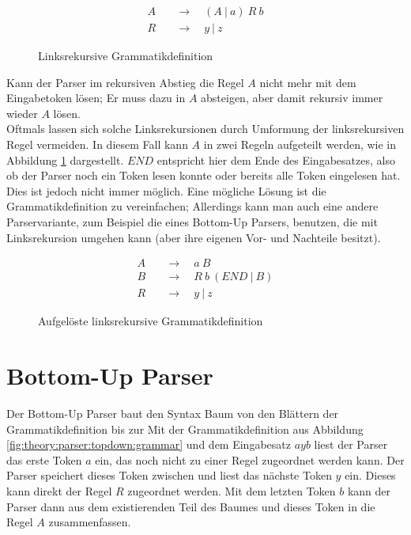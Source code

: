 \begin{figure}[H]
  \begin{align*}
    A &\quad\rightarrow\quad (A\ |\ a)\ R\ b \\
    R &\quad\rightarrow\quad y\ |\ z
  \end{align*}
  \caption{Linksrekursive Grammatikdefinition}
\end{figure}

Kann der Parser im rekursiven Abstieg die Regel $A$ nicht mehr mit dem Eingabetoken lösen; Er muss dazu in $A$ absteigen, aber damit rekursiv immer wieder $A$ lösen.\\
Oftmals lassen sich solche Linksrekursionen durch Umformung der linksrekursiven Regel vermeiden.
In diesem Fall kann $A$ in zwei Regeln aufgeteilt werden, wie in Abbildung \ref{fig:theory:parser:topdown:recursive} dargestellt.
$END$ entspricht hier dem Ende des Eingabesatzes, also ob der Parser noch ein Token lesen konnte oder bereits alle Token eingelesen hat.\\
Dies ist jedoch nicht immer möglich.
Eine mögliche Lösung ist die Grammatikdefinition zu vereinfachen;
Allerdings kann man auch eine andere Parservariante, zum Beispiel die eines Bottom-Up Parsers, benutzen, die mit Linksrekursion umgehen kann (aber ihre eigenen Vor- und Nachteile besitzt).

\begin{figure}[H]
  \begin{align*}
    A &\quad\rightarrow\quad a\ B \\
    B &\quad\rightarrow\quad R\ b\ (END\ |\ B) \\
    R &\quad\rightarrow\quad y\ |\ z
  \end{align*}
  \caption{Aufgelöste linksrekursive Grammatikdefinition}
  \label{fig:theory:parser:topdown:recursive}
\end{figure}

\section{Bottom-Up Parser}

Der Bottom-Up Parser baut den Syntax Baum von den Blättern der Grammatikdefinition bis zur
Mit der Grammatikdefinition aus Abbildung \ref{fig:theory:parser:topdown:grammar} und dem Eingabesatz $a y b$ liest der Parser das erste Token $a$ ein, das noch nicht zu einer Regel zugeordnet werden kann.
Der Parser speichert dieses Token zwischen und liest das nächste Token $y$ ein.
Dieses kann direkt der Regel $R$ zugeordnet werden.
Mit dem letzten Token $b$ kann der Parser dann aus dem existierenden Teil des Baumes und dieses Token in die Regel $A$ zusammenfassen.

